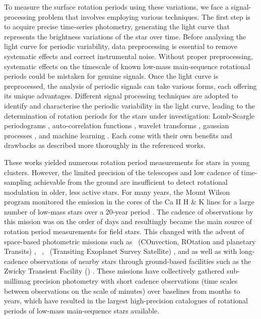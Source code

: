 To measure the surface rotation periods using these variations, we face a signal-processing problem that involves employing various techniques. 
The first step is to acquire precise time-series photometry, generating the light curve that represents the brightness variations of the star over time.
Before analysing the light curve for periodic variability, data preprocessing is essential to remove systematic effects and correct instrumental noise. 
Without proper preprocessing, systematic effects on the timescale of known low-mass main-sequence rotational periods could be mistaken for genuine signals.
Once the light curve is preprocessed, the analysis of periodic signals can take various forms, each offering its unique advantages. 
Different signal processing techniques are adopted to identify and characterise the periodic variability in the light curve, leading to the determination of rotation periods for the stars under investigation: Lomb-Scargle periodograms \citep[see, e.g.,][]{lomb_least_1976, scargle_studies_1982,mottola_slow_1995,scott_photometric_1992,reinhold_fast_2013,reinhold_rotation_2013}, auto-correlation functions \citep[see, e.g.,][]{aigrain_transiting_2008,garcia_rotation_2014,mcquillan_rotation_2014}, wavelet transforms \citep[see, e.g.,][]{garcia_rotation_2014}, gaussian processes \citep[see, e.g.,][]{angus_inferring_2017}, and machine learning \citep[see, e.g.,][]{claytor_recovery_2022}.
Each come with their own benefits and drawbacks as described more thoroughly in the referenced works.

These works yielded numerous rotation period measurements for stars in young clusters.
However, the limited precision of the telescopes and low cadence of time-sampling achievable from the ground are insufficient to detect rotational modulation in older, less active stars.
For many years, the Mount Wilson program monitored the emission in the cores of the Ca II H \& K lines for a large number of low-mass stars over a 20-year period \citep{wilson_probable_1963}.
The cadence of observations by this mission was on the order of days and resultingly became the main source of rotation period measurements for field stars.
This changed with the advent of space-based photometric missions such as \corot \ (COnvection, ROtation and planetary Transits) \citep{baglin_corot_2003}, \kepler \ \citep{borucki_kepler_2010, howell_k2_2014}, \tess \ (Transiting Exoplanet Survey Satellite) \citep{ricker_transiting_2014}, and \gaia{} \citep{distefano_gaia_2022} as well as with long-cadence observations of nearby stars through ground-based facilities such as the Zwicky Transient Facility (\ZTF) \citep{lu_bridging_2022}.
These missions have collectively gathered sub-millimag precision photometry with short cadence observations (time scales between observations on the scale of minutes) over baselines from months to years, which have resulted in the largest high-precision catalogues of rotational periods of low-mass main-sequence stars available.

